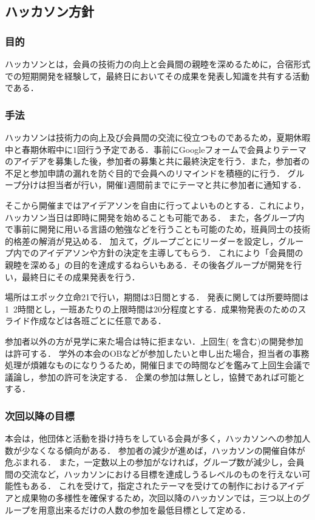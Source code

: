 \subsection*{ハッカソン方針}

\subsubsection*{目的}
ハッカソンとは，会員の技術力の向上と会員間の親睦を深めるために，合宿形式での短期開発を経験して，最終日においてその成果を発表し知識を共有する活動である．


\subsubsection*{手法}
ハッカソンは技術力の向上及び会員間の交流に役立つものであるため，夏期休暇中と春期休暇中に1回行う予定である．事前にGoogleフォームで会員よりテーマのアイデアを募集した後，参加者の募集と共に最終決定を行う．また，参加者の不足と参加申請の漏れを防ぐ目的で会員へのリマインドを積極的に行う．
グループ分けは担当者が行い，開催1週間前までにテーマと共に参加者に通知する．

そこから開催まではアイデアソンを自由に行ってよいものとする．これにより，ハッカソン当日は即時に開発を始めることも可能である．
また，各グループ内で事前に開発に用いる言語の勉強などを行うことも可能のため，班員同士の技術的格差の解消が見込める．
加えて，グループごとにリーダーを設定し，グループ内でのアイデアソンや方針の決定を主導してもらう．
これにより「会員間の親睦を深める」の目的を達成するねらいもある．その後各グループが開発を行い，最終日にその成果発表を行う．

場所はエポック立命21で行い，期間は3日間とする．
発表に関しては所要時間は1~2時間とし，一班あたりの上限時間は20分程度とする．成果物発表のためのスライド作成などは各班ごとに任意である．

参加者以外の方が見学に来た場合は特に拒まない．上回生(\fourthGrade{} を含む)の開発参加は許可する．
学外の本会のOBなどが参加したいと申し出た場合，担当者の事務処理が煩雑なものになりうるため，開催日までの時間などを鑑みて上回生会議で議論し，参加の許可を決定する．
企業の参加は無しとし，協賛であれば可能とする．



\subsubsection*{次回以降の目標}
本会は，他団体と活動を掛け持ちをしている会員が多く，ハッカソンへの参加人数が少なくなる傾向がある．
参加者の減少が進めば，ハッカソンの開催自体が危ぶまれる．
また，一定数以上の参加がなければ，グループ数が減少し，会員間の交流など，ハッカソンにおける目標を達成しうるレベルのものを行えない可能性もある．
これを受けて，指定されたテーマを受けての制作におけるアイデアと成果物の多様性を確保するため，次回以降のハッカソンでは，三つ以上のグループを用意出来るだけの人数の参加を最低目標として定める．


